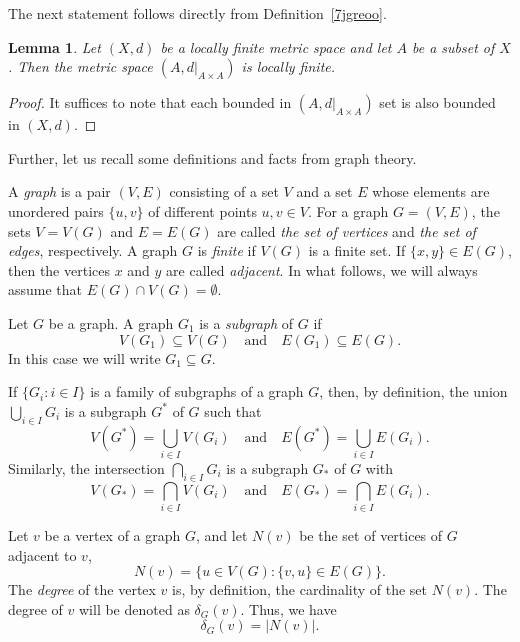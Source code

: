 \documentclass[pdflatex,sn-mathphys-num]{sn-jnl}%
\newtheorem{lemma}{Lemma}%
\theoremstyle{thmstyletwo}%
\begin{document}
The next statement follows directly from Definition~\ref{7jgreoo}.

\begin{lemma}\label{ettpaz86}
Let $(X,d)$ be a locally finite metric space and let $A $ be a subset of $X$. Then the metric space $(A, d|_{A \times A})$ is locally finite.
\end{lemma}

\begin{proof}

It suffices to note that each bounded in $ (A, d|_{A \times A})$ set is also  bounded in $ (X, d). $
\end{proof}



Further, let us recall some definitions and facts from graph theory.


A \textit{graph} is a pair $(V, E)$ consisting of a set $V$ and a set $E$ whose elements are unordered pairs $\{u, v\}$ of different points $u, v \in V$. For a graph $G = (V, E)$, the sets $V = V(G)$ and $E = E(G)$ are called \textit{the set of vertices} and \textit{the set of edges}, respectively. A graph $G$ is \textit{finite} if $V(G)$ is a finite set. If $\{x, y\} \in E(G)$, then the vertices $x$ and $y$ are called \textit{adjacent}. In what follows, we will always assume that $E(G) \cap V(G) = \emptyset$.



Let $G$ be a graph.
A graph \(G_1\) is a \emph{subgraph} of \(G\) if
\[
V(G_1) \subseteq V(G) \quad \text{and} \quad E(G_1) \subseteq E(G).
\]
In this case we will write \(G_1 \subseteq G\). 

If \(\{G_i \colon i \in I\}\) is a family of subgraphs of a graph \(G\), then, by definition, the union \(\bigcup_{i \in I} G_i\) is a subgraph \(G^{*}\) of \(G\) such that 
\[
V(G^{*}) = \bigcup_{i \in I} V(G_i) \quad \text{and} \quad E(G^{*}) = \bigcup_{i \in I} E(G_i).
\]
Similarly, the intersection \(\bigcap_{i \in I} G_i\) is a subgraph \(G_{*}\) of \(G\) with
\begin{equation*}%
V(G_{*}) = \bigcap_{i \in I} V(G_i) \quad \text{and} \quad E(G_{*}) = \bigcap_{i \in I} E(G_i).
\end{equation*}



Let \(v\) be a vertex of a graph \(G\), and let $N(v)$ be the set of vertices of $G$ adjacent to $v$,
\begin{equation}\label{edtg}
N(v) = \{ u \in V(G) \colon \{v, u\} \in E(G) \}.
\end{equation}
The {\it degree} of the vertex $v$ is, by definition, the cardinality of the set $N(v)$.  
The degree of $v$ will be denoted as $\delta_G(v)$. Thus, we have
\begin{equation*}
\delta_G(v) = |N(v)|.
\end{equation*}
\end{document}
